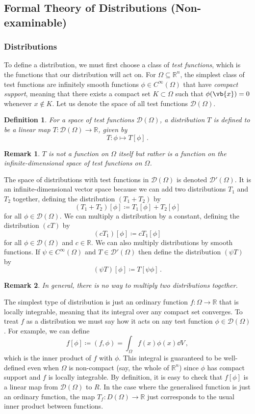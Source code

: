 \documentclass{article}
\theoremstyle{plain}\theoremheaderfont{\normalfont\itshape}\theorembodyfont{\rmfamily}\theoremseparator{.}\newtheorem*{rem}{Remark}\newtheorem*{ex}{Example}\newtheorem*{proof}{Proof}\newtheorem*{altp}{Alternative proof}
\theoremstyle{plain}\theoremheaderfont{\normalfont\bfseries}\theorembodyfont{\rmfamily}\theoremseparator{.}\newtheorem{thm}{Theorem}[section]\newtheorem{lem}[thm]{Lemma}\newtheorem{prop}[thm]{Proposition}\newtheorem*{cor}{Corollary}\newtheorem{defn}[thm]{Definition}\newtheorem{clm}[thm]{Claim}\newtheorem{clminproof}{Claim}
\theoremstyle{break}\theoremheaderfont{\normalfont\itshape}\theorembodyfont{\rmfamily}\theoremseparator{.\medskip}\newtheorem*{proofskip}{Proof}\newtheorem*{exs}{Examples}\newtheorem*{rems}{Remarks}
\theoremstyle{break}\theoremheaderfont{\normalfont\bfseries}\theorembodyfont{\rmfamily}\theoremseparator{.\medskip}\newtheorem{lemskip}[thm]{Lemma}\newtheorem{defnskip}[thm]{Definition}\newtheorem{propskip}[thm]{Proposition}\newtheorem{thmskip}[thm]{Theorem}
\numberwithin{equation}{section}
\begin{document}
	\subsection{Formal Theory of 
	Distributions (Non-examinable)}
	\subsubsection{Distributions}
	To define a distribution, we must first choose a class of \textit{test functions}, which is the functions that our distribution will act on. For \(\Omega\subseteq\mathbb{R}^n\), the simplest class of test functions are infinitely smooth functions \(\phi\in C^\infty(\Omega)\) that have \textit{compact support}, meaning that there exists a compact set \(K\subset\Omega\) such that \(\phi(\vb{x})=0\) whenever \(x\notin K\). Let us denote the space of all test functions \(\mathcal{D}(\Omega)\).
	\begin{defn}
		For a space of test functions \(\mathcal{D}(\Omega)\), a \textit{distribution} \(T\) is defined to be a linear map \(T:\mathcal{D}(\Omega)\to\mathbb{R}\), given by
		\[T:\phi\mapsto T[\phi]\,.\]
	\end{defn}
	\begin{rem}
		\(T\) is not a function on \(\Omega\) itself but rather is a function on the infinite-dimensional space of test functions on \(\Omega\).
	\end{rem}

	The space of distributions with test functions in \(\mathcal{D}(\Omega)\) is denoted \(\mathcal{D}'(\Omega)\). It is an infinite-dimensional vector space because we can add two distributions \(T_1\) and \(T_2\) together, defining the distribution \((T_1+T_2)\) by
	\[(T_1+T_2)[\phi]\coloneqq T_1[\phi]+T_2[\phi]\]
	for all \(\phi\in\mathcal{D}(\Omega)\). We can multiply a distribution by a constant, defining the distribution \((cT)\) by
	\[(cT_1)[\phi]\coloneqq cT_1[\phi]\]
	for all \(\phi\in\mathcal{D}(\Omega)\) and \(c\in\mathbb{R}\). We can also multiply distributions by smooth functions. If \(\psi\in C^\infty(\Omega)\) and \(T\in\mathcal{D}'(\Omega)\) then define the distribution \((\psi T)\) by
	\[(\psi T)[\phi]\coloneqq T[\psi\phi]\,.\]
	\begin{rem}
		In general, there is no way to multiply two distributions together.
	\end{rem}
	The simplest type of distribution is just an ordinary function \(f:\Omega\to\mathbb{R}\) that is locally integrable, meaning that its integral over any compact set converges. To treat \(f\) as a distribution we must say how it acts on any test function \(\phi\in\mathcal{D}(\Omega)\). For example, we can define
	\[f[\phi]\coloneqq(f,\phi)=\int_\Omega f(x)\phi(x)\dd{V}\,,\]
	which is the inner product of \(f\) with \(\phi\). This integral is guaranteed to be well-defined even when \(\Omega\) is non-compact (say, the whole of \(\mathbb{R}^n\)) since \(\phi\) has compact support and \(f\) is locally integrable. By definition, it is easy to check that \(f[\phi]\) is a linear map from \(\mathcal{D}(\Omega)\) to \(R\). In the case where the generalised function is just an ordinary function, the map \(T_f:D(\Omega)\to\mathbb{R}\) just corresponds to the usual inner product between functions.
\end{document}
